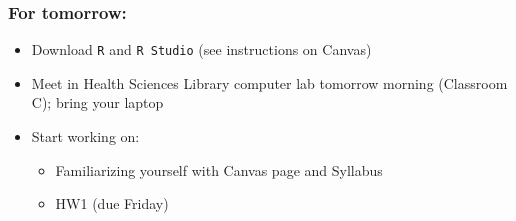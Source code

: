 \documentclass[12pt, 
hyperref={colorlinks=true, linkcolor=blue, urlcolor=cyan}]{beamer}
\begin{document}

\begin{frame}
\frametitle{For tomorrow:}

\begin{itemize}
\item Download \texttt{R} and \texttt{R Studio} (see instructions on Canvas)
\item Meet in Health Sciences Library computer lab tomorrow morning (Classroom C); bring your laptop
\item Start working on:
	\begin{itemize}
	\item Familiarizing yourself with Canvas page and Syllabus
	\item HW1 (due Friday)
	\end{itemize}
\end{itemize}

\end{frame}
\end{document}
